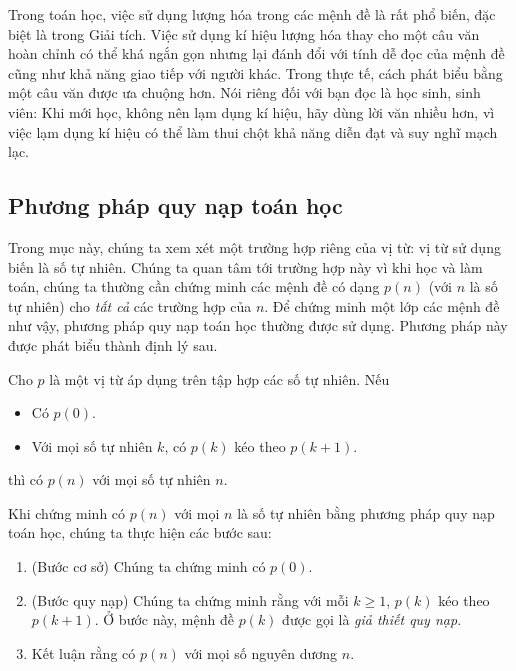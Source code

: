 Trong toán học, việc sử dụng lượng hóa trong các mệnh đề là rất phổ biến, đặc biệt là trong Giải tích. Việc sử dụng kí hiệu lượng hóa thay cho một câu văn hoàn chỉnh có thể khá ngắn gọn nhưng lại đánh đổi với tính dễ đọc của mệnh đề cũng như khả năng giao tiếp với người khác. Trong thực tế, cách phát biểu bằng một câu văn được ưa chuộng hơn. Nói riêng đối với bạn đọc là học sinh, sinh viên: Khi mới học, không nên lạm dụng kí hiệu, hãy dùng lời văn nhiều hơn, vì việc lạm dụng kí hiệu có thể làm thui chột khả năng diễn đạt và suy nghĩ mạch lạc.

\subsection{Phương pháp quy nạp toán học}

Trong mục này, chúng ta xem xét một trường hợp riêng của vị từ: vị từ sử dụng biến là số tự nhiên. Chúng ta quan tâm tới trường hợp này vì khi học và làm toán, chúng ta thường cần chứng minh các mệnh đề có dạng $p(n)$ (với $n$ là số tự nhiên) cho \textit{tất cả} các trường hợp của $n$. Để chứng minh một lớp các mệnh đề như vậy, phương pháp quy nạp toán học thường được sử dụng. Phương pháp này được phát biểu thành định lý sau.

\begin{theorem}
    Cho $p$ là một vị từ áp dụng trên tập hợp các số tự nhiên. Nếu
    \begin{itemize}
        \item Có $p(0)$.
        \item Với mọi số tự nhiên $k$, có $p(k)$ kéo theo $p(k + 1)$.
    \end{itemize}

    thì có $p(n)$ với mọi số tự nhiên $n$.
\end{theorem}

Khi chứng minh có $p(n)$ với mọi $n$ là số tự nhiên bằng phương pháp quy nạp toán học, chúng ta thực hiện các bước sau:

\begin{enumerate}[label={\textbf{Bước \arabic*.}},itemindent=1cm]
    \item (Bước cơ sở) Chúng ta chứng minh có $p(0)$.
    \item (Bước quy nạp) Chúng ta chứng minh rằng với mỗi $k\geq 1$, $p(k)$ kéo theo $p(k+1)$. Ở bước này, mệnh đề $p(k)$ được gọi là \textit{giả thiết quy nạp}.
    \item Kết luận rằng có $p(n)$ với mọi số nguyên dương $n$.
\end{enumerate}

